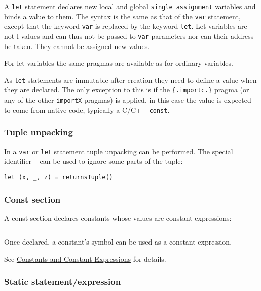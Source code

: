A \texttt{let} statement declares new local and global
\texttt{single\ assignment} variables and binds a value to them. The
syntax is the same as that of the \texttt{var} statement, except that
the keyword \texttt{var} is replaced by the keyword \texttt{let}. Let
variables are not l-values and can thus not be passed to \texttt{var}
parameters nor can their address be taken. They cannot be assigned new
values.

For let variables the same pragmas are available as for ordinary
variables.

As \texttt{let} statements are immutable after creation they need to
define a value when they are declared. The only exception to this is if
the \texttt{\{.importc.\}} pragma (or any of the other \texttt{importX}
pragmas) is applied, in this case the value is expected to come from
native code, typically a C/C++ \texttt{const}.

\hypertarget{tuple-unpacking}{%
\subsubsection{Tuple unpacking}\label{tuple-unpacking}}

In a \texttt{var} or \texttt{let} statement tuple unpacking can be
performed. The special identifier \texttt{\_} can be used to ignore some
parts of the tuple:

\begin{verbatim}
let (x, _, z) = returnsTuple()
\end{verbatim}

\hypertarget{const-section}{%
\subsubsection{Const section}\label{const-section}}

A const section declares constants whose values are constant
expressions:

\begin{verbatim}
\end{verbatim}

Once declared, a constant's symbol can be used as a constant expression.

See \protect\hyperlink{constants-and-constant-expressions}{Constants and
Constant Expressions} for details.

\hypertarget{static-statementexpression}{%
\subsubsection{Static
statement/expression}\label{static-statementexpression}}

